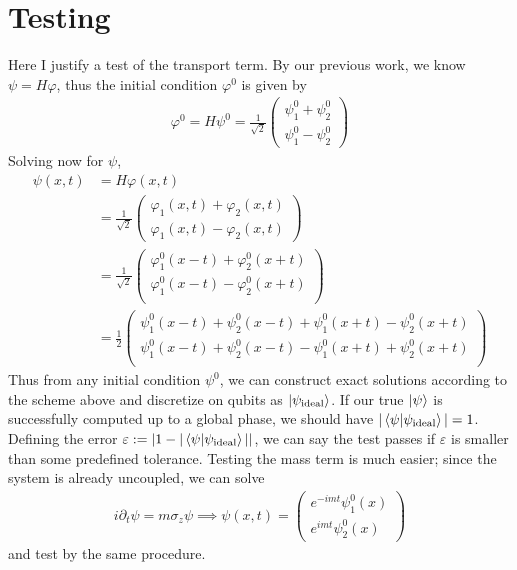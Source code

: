 \documentclass[10pt]{article}
\begin{document}
\section*{Testing}
Here I justify a test of the transport term. By our previous work,
we know $\psi = H \varphi$, thus the initial condition $\varphi^0$ is given by 
\begin{align*}
    \varphi^0 = H \psi^0 = 
    \frac{1}{\sqrt{2}}
    \begin{pmatrix}
        \psi_1^0 + \psi_2^0 \\
        \psi_1^0 - \psi_2^0
    \end{pmatrix}
\end{align*}
Solving now for $\psi$,
\begin{align*}
    \psi(x, t) &= H \varphi(x, t) \\
    &= \frac{1}{\sqrt{2}}
    \begin{pmatrix}
        \varphi_1(x, t) + \varphi_2(x, t) \\
        \varphi_1(x, t) - \varphi_2(x, t)
    \end{pmatrix} \\
    &= \frac{1}{\sqrt{2}}
    \begin{pmatrix}
        \varphi_1^0(x - t) + \varphi_2^0(x + t) \\
        \varphi_1^0(x - t) - \varphi_2^0(x + t) \\
    \end{pmatrix} \\
    &= \frac{1}{2}
    \begin{pmatrix}
        \psi_1^0(x-t) + \psi_2^0(x-t) + \psi_1^0(x+t) - \psi_2^0(x+t) \\
        \psi_1^0(x-t) + \psi_2^0(x-t) - \psi_1^0(x+t) + \psi_2^0(x+t) \\
    \end{pmatrix}
\end{align*}
Thus from any initial condition $\psi^0$, we can construct exact solutions according
to the scheme above and discretize on qubits as $\ket{\psi_\text{ideal}}$. If our
true $\ket{\psi}$ is successfully computed up to a global phase, we should have
$|\braket{\psi|\psi_{\text{ideal}}}| = 1$. Defining the error $\varepsilon :=
\left|1 - |\braket{\psi|\psi_{\text{ideal}}}|\right|$, we can say the test passes if $\varepsilon$
is smaller than some predefined tolerance. Testing the mass term is much easier;
since the system is already uncoupled, we can solve
\begin{align*}
    i \partial_t \psi = m \sigma_z \psi \implies \psi(x, t) =
    \begin{pmatrix}
        e^{-im t} \psi_1^0(x) \\
        e^{imt} \psi_2^0(x)
    \end{pmatrix}
\end{align*}
and test by the same procedure.
\end{document}
